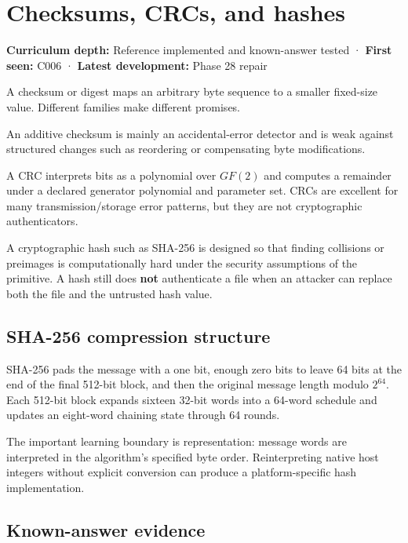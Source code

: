 \hypertarget{appendix-ed338677de0a}{}
\section{Checksums, CRCs, and hashes}\label{appendix-ed338677de0a-checksums-crcs-and-hashes}

\textbf{Curriculum depth:} Reference implemented and known-answer tested · \textbf{First seen:} C006 · \textbf{Latest development:} Phase 28 repair

A checksum or digest maps an arbitrary byte sequence to a smaller fixed-size value. Different families make different promises.

An additive checksum is mainly an accidental-error detector and is weak against structured changes such as reordering or compensating byte modifications.

A CRC interprets bits as a polynomial over \(GF(2)\) and computes a remainder under a declared generator polynomial and parameter set. CRCs are excellent for many transmission/storage error patterns, but they are not cryptographic authenticators.

A cryptographic hash such as SHA-256 is designed so that finding collisions or preimages is computationally hard under the security assumptions of the primitive. A hash still does \textbf{not} authenticate a file when an attacker can replace both the file and the untrusted hash value.

\subsection{SHA-256 compression structure}\label{appendix-ed338677de0a-sha-256-compression-structure}

SHA-256 pads the message with a one bit, enough zero bits to leave 64 bits at the end of the final 512-bit block, and then the original message length modulo \(2^{64}\). Each 512-bit block expands sixteen 32-bit words into a 64-word schedule and updates an eight-word chaining state through 64 rounds.

The important learning boundary is representation: message words are interpreted in the algorithm's specified byte order. Reinterpreting native host integers without explicit conversion can produce a platform-specific hash implementation.

\subsection{Known-answer evidence}\label{appendix-ed338677de0a-known-answer-evidence}

